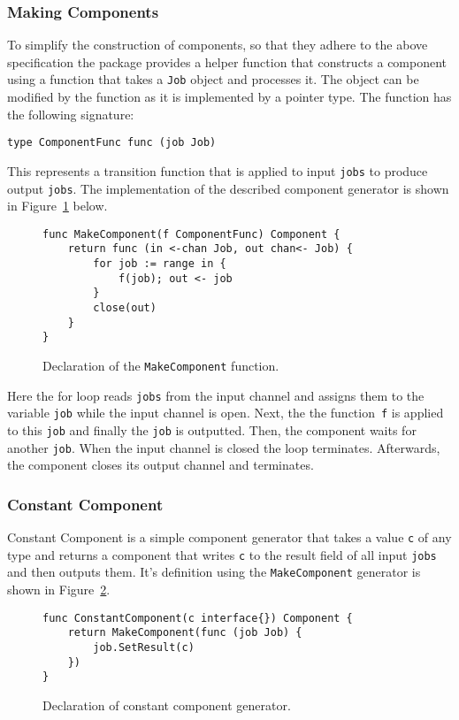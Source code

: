 \subsubsection{Making Components}
To simplify the construction of components, so that they adhere to 
the above specification the package provides a helper function that 
constructs a component using a function that takes a \texttt{Job} object 
and processes it. The object can be modified by the function as it is 
implemented by a pointer type. The function has the following signature:
\begin{lstlisting}
type ComponentFunc func (job Job)
\end{lstlisting}
This represents a transition function that is applied to input \texttt{jobs}
to produce output \texttt{jobs}.
The implementation of the described component generator is shown in 
Figure~\ref{fig:MakeComponent} below.
\begin{figure}[h]
\centering
\begin{lstlisting}
func MakeComponent(f ComponentFunc) Component {
    return func (in <-chan Job, out chan<- Job) {
        for job := range in {
            f(job); out <- job
        }
        close(out)
    }
}
\end{lstlisting}
\caption[scale=1.0]{Declaration of the \texttt{MakeComponent} function.}
\label{fig:MakeComponent}
\end{figure}

Here the for loop reads \texttt{jobs} from the input channel and assigns them
to the variable \texttt{job} while the input channel is open. Next, the 
the function~\texttt{f} is applied to this \texttt{job} and finally 
the \texttt{job} is outputted.
Then, the component waits for another \texttt{job}. When the input channel
is closed the loop terminates. Afterwards, the component closes its output channel
and terminates.

\subsubsection{Constant Component}
Constant Component is a simple component generator that takes a value \texttt{c}
of any type and returns a component that writes \texttt{c} to the result field of 
all input \texttt{jobs} and then outputs them. It's definition using the 
\texttt{MakeComponent} generator is shown in Figure~\ref{fig:ConstantComponent}.
\begin{figure}[h]
\centering
\begin{lstlisting}
func ConstantComponent(c interface{}) Component {
    return MakeComponent(func (job Job) {
        job.SetResult(c)
    })
}
\end{lstlisting}
\caption[scale=1.0]{Declaration of constant component generator.}
\label{fig:ConstantComponent}
\end{figure}

